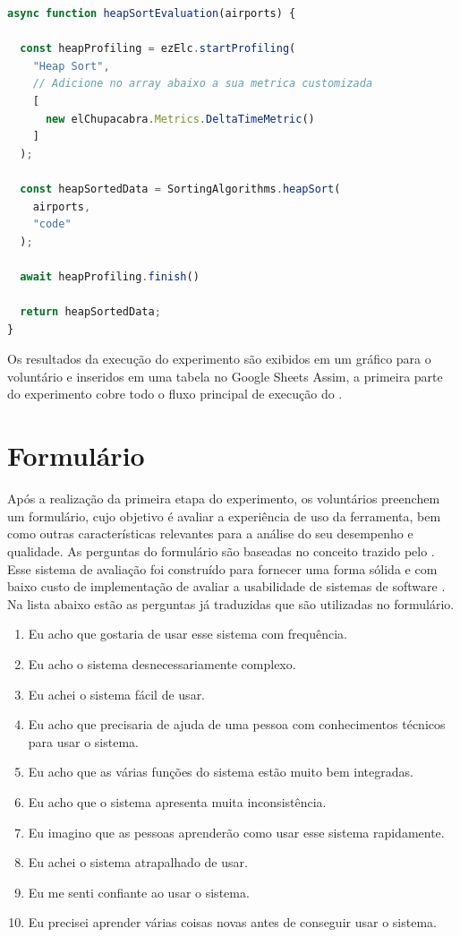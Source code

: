 \documentclass[12pt]{tcc}
\begin{document}
\begin{minipage}{\linewidth}
\begin{lstlisting}[label={lst:experimento-heap}, caption={Fluxo de código referente a execução da ordenação com o Heap Sort.}, language=TypeScript, breaklines=true]
async function heapSortEvaluation(airports) {

  const heapProfiling = ezElc.startProfiling(
    "Heap Sort",
    // Adicione no array abaixo a sua metrica customizada
    [
      new elChupacabra.Metrics.DeltaTimeMetric()
    ]
  );

  const heapSortedData = SortingAlgorithms.heapSort(
    airports,
    "code"
  );

  await heapProfiling.finish()
    
  return heapSortedData;
}
\end{lstlisting}
\end{minipage}


	Os resultados da execução do experimento são exibidos em um gráfico para o voluntário e inseridos em uma tabela no Google Sheets
	Assim, a primeira parte do experimento cobre todo o fluxo principal de execução do .


	\section{Formulário}
	\label{section:parte-2-formulario}

	Após a realização da primeira etapa do experimento, os voluntários preenchem um formulário, cujo objetivo é avaliar a experiência de uso da ferramenta, bem como outras características relevantes para a análise do seu desempenho e qualidade. As perguntas do formulário são baseadas no conceito trazido pelo . Esse sistema de avaliação foi construído para fornecer uma forma sólida e com baixo custo de implementação de avaliar a usabilidade de sistemas de software \citep{brooke1995sus}. Na lista abaixo estão as perguntas já traduzidas que são utilizadas no formulário.

	\begin{enumerate}
		\itemsep 0em 

		\item Eu acho que gostaria de usar esse sistema com frequência.
		\item Eu acho o sistema desnecessariamente complexo.
		\item Eu achei o sistema fácil de usar.
		\item Eu acho que precisaria de ajuda de uma pessoa com conhecimentos técnicos para usar o sistema.
		\item Eu acho que as várias funções do sistema estão muito bem integradas.
		\item Eu acho que o sistema apresenta muita inconsistência.
		\item Eu imagino que as pessoas aprenderão como usar esse sistema rapidamente.
		\item Eu achei o sistema atrapalhado de usar.
		\item Eu me senti confiante ao usar o sistema.
		\item Eu precisei aprender várias coisas novas antes de conseguir usar o sistema.
	\end{enumerate}
\end{document}
